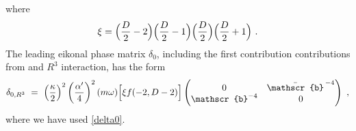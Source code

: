 \documentclass[a4paper,11pt]{article}
\numberwithin{equation}{section}
\begin{document}
where  
\begin{align}
\label{xi}
\xi = \Big({D\over 2} -2\Big)\Big({D\over 2} -1\Big)\Big({D\over 2} \Big)\Big({D\over 2} +1\Big)
\ .
\end{align}
%
% 
The leading  eikonal phase matrix  $ \delta_0$, including the first contribution contributions from and $R^3$ interaction, has the form
\begin{align}
\label{leadingtree}
\mathcal{\delta}_{0, R^3} \ = \  \left({\kappa\over 2}\right)^2 \left({\alpha^\prime\over 4}\right)^2 ( m \omega) \Big[\xi f (-2, D-2)\Big]  \begin{pmatrix}0 &  \bar{\mathscr{b}}^{\,-4}\\
\mathscr{b}^{- 4} & 0
 \end{pmatrix}
 \ , 
\end{align}
where  we have used \eqref{delta0}.
\end{document}
